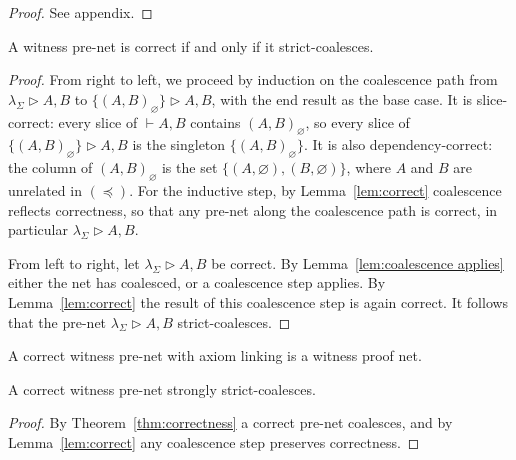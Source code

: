 \documentclass[UKenglish]{lipics-v2016}
\theoremstyle{plain}
\newcommand\+{+}
\renewcommand\*{\times}
\newcommand\dep{\preccurlyeq}
\newcommand\seq[2]{{\vdash}#1,#2}
\newcommand\net[3]{#1\triangleright #2,#3}
\newcommand\link[3][\sigma]{(#2,#3)_{#1}}
\begin{document}
\begin{proof}
See appendix.
\end{proof}


\begin{theorem}
\label{thm:correctness}
A witness pre-net is correct if and only if it strict-coalesces. 
\end{theorem}

\begin{proof}
From right to left, we proceed by induction on the coalescence path from $\net{\lambda_\Sigma}AB$ to $\net{\{\link[\varnothing]AB\}}AB$, with the end result as the base case. It is slice-correct: every slice of $\seq AB$ contains $\link[\varnothing]AB$, so every slice of $\net{\{\link[\varnothing]AB\}}AB$ is the singleton $\{\link[\varnothing]AB\}$. It is also dependency-correct: the column of $\link[\varnothing]AB$ is the set $\{(A,\varnothing),(B,\varnothing)\}$, where $A$ and $B$ are unrelated in $(\dep)$. For the inductive step, by Lemma~\ref{lem:correct} coalescence reflects correctness, so that any pre-net along the coalescence path is correct, in particular $\net{\lambda_\Sigma}AB$.

From left to right, let $\net{\lambda_\Sigma}AB$ be correct. By Lemma~\ref{lem:coalescence applies} either the net has coalesced, or a coalescence step applies. By Lemma~\ref{lem:correct} the result of this coalescence step is again correct. It follows that the pre-net $\net{\lambda_\Sigma}AB$ strict-coalesces.
\end{proof}


\begin{corollary}
A correct witness pre-net with axiom linking is a witness proof net.
\end{corollary}


\begin{corollary}
\label{cor:strong coalescence}
A correct witness pre-net strongly strict-coalesces.
\end{corollary}

\begin{proof}
By Theorem~\ref{thm:correctness} a correct pre-net coalesces, and by Lemma~\ref{lem:correct} any coalescence step preserves correctness.
\end{proof}
\end{document}
